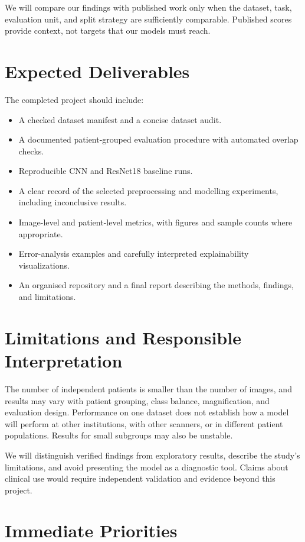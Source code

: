 \documentclass[11pt,a4paper]{article}
\begin{document}
We will compare our findings with published work only when the dataset, task, evaluation unit, and split strategy are sufficiently comparable. Published scores provide context, not targets that our models must reach.

\section{Expected Deliverables}

The completed project should include:
\begin{itemize}
    \item A checked dataset manifest and a concise dataset audit.
    \item A documented patient-grouped evaluation procedure with automated overlap checks.
    \item Reproducible CNN and ResNet18 baseline runs.
    \item A clear record of the selected preprocessing and modelling experiments, including inconclusive results.
    \item Image-level and patient-level metrics, with figures and sample counts where appropriate.
    \item Error-analysis examples and carefully interpreted explainability visualizations.
    \item An organised repository and a final report describing the methods, findings, and limitations.
\end{itemize}

\section{Limitations and Responsible Interpretation}

The number of independent patients is smaller than the number of images, and results may vary with patient grouping, class balance, magnification, and evaluation design. Performance on one dataset does not establish how a model will perform at other institutions, with other scanners, or in different patient populations. Results for small subgroups may also be unstable.

We will distinguish verified findings from exploratory results, describe the study's limitations, and avoid presenting the model as a diagnostic tool. Claims about clinical use would require independent validation and evidence beyond this project.

\section{Immediate Priorities}
\end{document}
